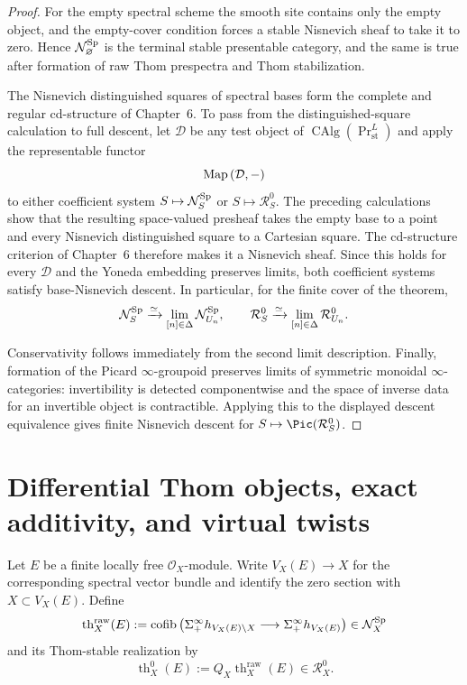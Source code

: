 \begin{proof}
For the empty spectral scheme the smooth site contains only the empty object,
and the empty-cover condition forces a stable Nisnevich sheaf to take it to
zero.  Hence $\mathcal N_\varnothing^{\mathrm{Sp}}$ is the terminal stable presentable
category, and the same is true after formation of raw Thom prespectra and Thom
stabilization.

The Nisnevich distinguished squares of spectral bases form the complete and
regular cd-structure of Chapter~6.  To pass from the distinguished-square
calculation to full descent, let $\mathcal D$ be any test object of
$\operatorname{CAlg}(\operatorname{Pr}^{L}_{\mathrm{st}})$ and apply the
representable functor
\[
    \operatorname{Map}
    \left(
      \mathcal D,-
    \right)
\]
to either coefficient system $S\mapsto\mathcal N_S^{\mathrm{Sp}}$ or
$S\mapsto\mathcal R_S^0$.  The preceding calculations show that the resulting
space-valued presheaf takes the empty base to a point and every Nisnevich
distinguished square to a Cartesian square.  The cd-structure criterion of
Chapter~6 therefore makes it a Nisnevich sheaf.  Since this holds for every
$\mathcal D$ and the Yoneda embedding preserves limits, both coefficient
systems satisfy base-Nisnevich descent.  In particular, for the finite cover
of the theorem,
\[
    \mathcal N_S^{\mathrm{Sp}}
    \xrightarrow{\simeq}
    \operatorname*{lim}_{[n]\in\Delta}\mathcal N_{U_n}^{\mathrm{Sp}},
    \qquad
    \mathcal R_S^0
    \xrightarrow{\simeq}
    \operatorname*{lim}_{[n]\in\Delta}\mathcal R_{U_n}^0.
\]

Conservativity follows immediately from the second limit description.  Finally,
formation of the Picard $\infty$-groupoid preserves limits of symmetric
monoidal $\infty$-categories: invertibility is detected componentwise and the
space of inverse data for an invertible object is contractible.  Applying this
to the displayed descent equivalence gives finite Nisnevich descent for
$S\mapsto\Pic(\mathcal R_S^0)$.
\end{proof}

\section{Differential Thom objects, exact additivity, and virtual twists}
\label{sec:bn-diff-differential-thom}

\begin{definition}
\label{def:bn-diff-raw-vector-thom}
Let \(E\) be a finite locally free \(\mathcal O_X\)-module.  Write
\(V_X(E)\to X\) for the corresponding spectral vector bundle and identify the
zero section with \(X\subset V_X(E)\).  Define
\[
  \operatorname{th}^{\mathrm{raw}}_X(E)
  :=
  \operatorname{cofib}\left(
    \Sigma^\infty_+h_{V_X(E)\setminus X}
    \longrightarrow
    \Sigma^\infty_+h_{V_X(E)}
  \right)
  \in\mathcal N_X^{\mathrm{Sp}}
\]
and its Thom-stable realization by
\[
  \boxed{
  \operatorname{th}^0_X(E)
  :=
  Q_X\operatorname{th}^{\mathrm{raw}}_X(E)
  \in\mathcal R_X^0.
  }
\]
\end{definition}

